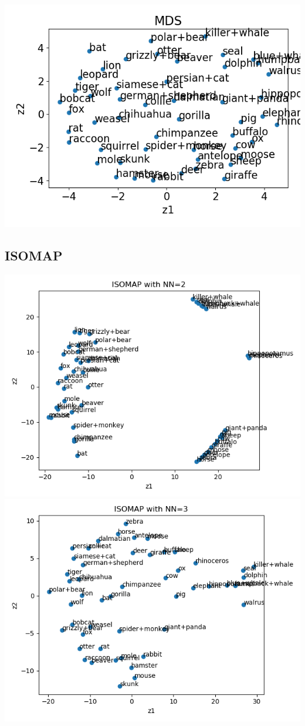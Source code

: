 \documentclass{article}
\begin{document}
\includegraphics[scale=0.7]{../figs/MDS_animals.png}

\subsection{ISOMAP}

\includegraphics[scale=0.7]{ISOMAP2_animals.png}\\
\includegraphics[scale=0.7]{ISOMAP3_animals.png}\\
\end{document}
